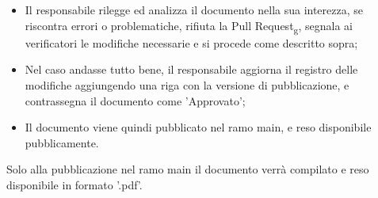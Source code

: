 \begin{itemize}
\begin{itemize}
                \item Il responsabile rilegge ed analizza il documento nella sua interezza, se riscontra errori o problematiche, rifiuta la Pull Request\textsubscript{g}, segnala ai verificatori le modifiche necessarie e si procede come descritto sopra;
                \item Nel caso andasse tutto bene, il responsabile aggiorna il registro delle modifiche aggiungendo una riga con la versione di pubblicazione, e contrassegna il documento come 'Approvato';
                \item Il documento viene quindi pubblicato nel ramo main, e reso disponibile pubblicamente.
            \end{itemize}
        \end{itemize}
        Solo alla pubblicazione nel ramo main il documento verrà compilato e reso disponibile in formato '.pdf'.
        \newpage

